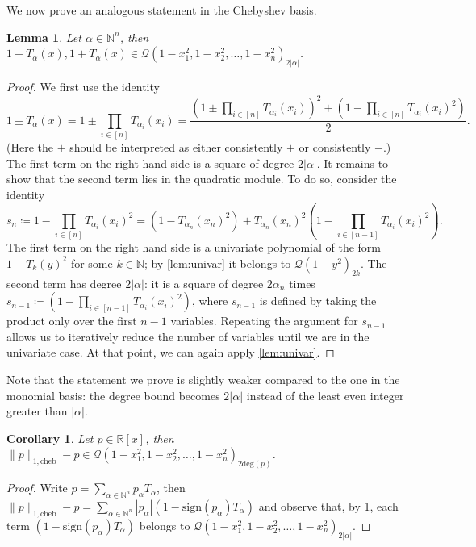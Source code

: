 \documentclass[11pt]{article}
\newcommand{\N}{\mathbb{N}}
\newcommand{\R}{\mathbb{R}}
\newtheorem{corollary}[defin]{Corollary}
\newtheorem{lemma}[defin]{Lemma}
\theoremstyle{definition}
\newcommand{\cheb}{{1,\mathrm{cheb}}}
\newcommand{\SG}[1]{\textcolor{orange}{[SG: #1]}}
\begin{document}
We now prove an analogous statement in the Chebyshev basis.
\begin{lemma} \label{lem:chebQ}
    Let $\alpha \in \N^n$, then $1-T_\alpha(x), 1+T_\alpha(x) \in \mathcal Q(1-x_1^2,1-x_2^2,\ldots, 1-x_n^2)_{2|\alpha|}$.
\end{lemma}
\begin{proof}
    We first use the identity
    \[
    1 \pm T_\alpha(x) = 1 \pm \prod_{i \in [n]} T_{\alpha_i}(x_i) = \frac{\left(1\pm\prod_{i \in [n]} T_{\alpha_i}(x_i)\right)^2 + \left(1-\prod_{i \in [n]} T_{\alpha_i}(x_i)^2\right)}{2}.
    \]
    (Here the $\pm$ should be interpreted as either consistently $+$ or consistently $-$.) The first term on the right hand side is a square of degree $2|\alpha|$. It remains to show that the second term lies in the quadratic module. To do so, consider the identity
    \[
    s_n \coloneqq 1-\prod_{i \in [n]} T_{\alpha_i}(x_i)^2 = \left(1-T_{\alpha_n}(x_n)^2\right) + T_{\alpha_n}(x_n)^2\left(1-\prod_{i \in [n-1]} T_{\alpha_i}(x_i)^2\right).
    \]
        The first term on the right hand side is a univariate polynomial of the form $1-T_k(y)^2$ for some $k \in \N$; by \cref{lem:univar} it belongs to $\mathcal Q(1-y^2)_{2k}$. The second term has degree $2|\alpha|$: it is a square of degree $2\alpha_n$ times $s_{n-1} \coloneqq \left(1-\prod_{i \in [n-1]} T_{\alpha_i}(x_i)^2\right)$, where $s_{n-1}$ is defined by taking the product only over the first $n-1$ variables. Repeating the argument for $s_{n-1}$ allows us to iteratively reduce the number of variables until we are in the univariate case. At that point, we can again apply \cref{lem:univar}. %
\end{proof}

Note that the statement we prove is slightly weaker compared to the one in the monomial basis: the degree bound becomes $2|\alpha|$ instead of the least even integer greater than $|\alpha|$.


\begin{corollary} \label{cor:1cheb}
    Let $p \in \R[x]$, then $\|p\|_\cheb - p \in \mathcal Q(1-x_1^2,1-x_2^2,\ldots, 1-x_n^2)_{2\mathrm{deg}(p)}$.
\end{corollary}
\begin{proof}
    Write $p = \sum_{\alpha \in \N^n} p_\alpha T_\alpha$, then
    $\|p\|_\cheb - p = \sum_{\alpha \in \N^n} |p_\alpha| (1- \mathrm{sign}(p_\alpha)T_\alpha)$ and observe that, by \cref{lem:chebQ}, each term $(1- \mathrm{sign}(p_\alpha)T_\alpha)$ belongs to $\mathcal Q(1-x_1^2,1-x_2^2,\ldots, 1-x_n^2)_{2|\alpha|}$.
\end{proof}
\end{document}
